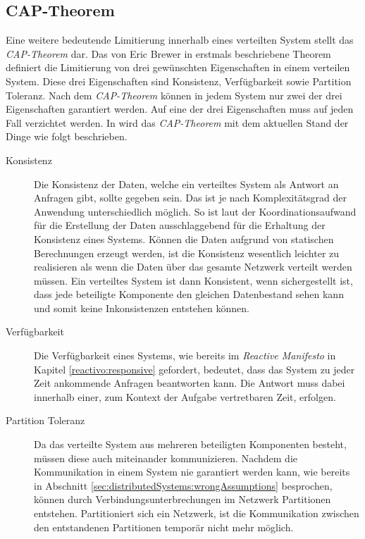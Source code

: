 \subsection{CAP-Theorem}\label{sec:distributedSystems:capTheorem}
Eine weitere bedeutende Limitierung innerhalb eines verteilten System stellt das \textit{CAP-Theorem} dar. Das von Eric Brewer in \cite{Brewer2000TowardsSystems} erstmals beschriebene Theorem definiert die Limitierung von drei gewünschten Eigenschaften in einem verteilen System. Diese drei Eigenschaften sind Konsistenz, Verfügbarkeit sowie Partition Toleranz. Nach dem \textit{CAP-Theorem} können in jedem System nur zwei der drei Eigenschaften garantiert werden. Auf eine der drei Eigenschaften muss auf jeden Fall verzichtet werden. In \cite{gilbertPerspectiveCAPTheorem2012} wird das \textit{CAP-Theorem} mit dem aktuellen Stand der Dinge wie folgt beschrieben.
\begin{description}
\item[Konsistenz]
Die Konsistenz der Daten, welche ein verteiltes System als Antwort an Anfragen gibt, sollte gegeben sein. Das ist je nach Komplexitätsgrad der Anwendung unterschiedlich möglich. So ist laut \cite{gilbertPerspectiveCAPTheorem2012} der Koordinationsaufwand für die Erstellung der Daten ausschlaggebend für die Erhaltung der Konsistenz eines Systems. Können die Daten aufgrund von statischen Berechnungen erzeugt werden, ist die Konsistenz wesentlich leichter zu realisieren als wenn die Daten über das gesamte Netzwerk verteilt werden müssen. Ein verteiltes System ist dann Konsistent, wenn sichergestellt ist, dass jede beteiligte Komponente den gleichen Datenbestand sehen kann und somit keine Inkonsistenzen entstehen können.  

\item[Verfügbarkeit]
Die Verfügbarkeit eines Systems, wie bereits im {\textit{Reactive Manifesto}} in Kapitel \ref{reactivo:responsive} gefordert, bedeutet, dass das System zu jeder Zeit ankommende Anfragen beantworten kann. Die Antwort muss dabei innerhalb einer, zum Kontext der Aufgabe vertretbaren Zeit, erfolgen.

\item[Partition Toleranz]
Da das verteilte System aus mehreren beteiligten Komponenten besteht, müssen diese auch miteinander kommunizieren. Nachdem die Kommunikation in einem System nie garantiert werden kann, wie bereits in Abschnitt \ref{sec:distributedSystems:wrongAssumptions} besprochen, können durch Verbindungsunterbrechungen im Netzwerk Partitionen entstehen. Partitioniert sich ein Netzwerk, ist die Kommunikation zwischen den entstandenen Partitionen temporär nicht mehr möglich.
\end{description}
